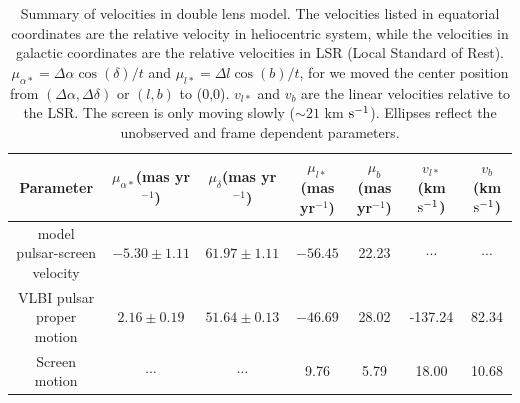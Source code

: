 \documentclass[useAMS,usenatbib]{mn2e}
\begin{document}



\begin{table}
\centering
\begin{tabular}{c|cccccc}
\hline
Parameter & $\mu_{\alpha*}$(mas yr$^{-1}$) & $\mu_{\delta}$(mas yr$^{-1}$) & $\mu_{l*}$(mas yr$^{-1}$) & $\mu_b$ (mas yr$^{-1}$) & $v_{l*}$ (km $\rm s^{-1}$) & $v_b$ (km $\rm s^{-1}$) \\
\hline
model pulsar-screen velocity & $-5.30 \pm 1.11$  & $61.97 \pm 1.11$  & $-56.45$ & 22.23 &  $\cdots$ & $\cdots$\\
VLBI pulsar proper motion & $2.16 \pm 0.19$ & $51.64 \pm 0.13$ & $-46.69$ & 28.02 & -137.24 & 82.34 \\
Screen motion & $\cdots$ & $\cdots$  & 9.76 & 5.79 & 18.00 & 10.68\\
\hline
\end{tabular}
\caption{Summary of velocities in double lens model. The velocities
listed in equatorial coordinates are the relative velocity in
heliocentric system, while the velocities in galactic coordinates are
the relative velocities in LSR (Local Standard of Rest). $\mu_{\alpha*}=\Delta\alpha\cos(\delta)/t$ and $\mu_{l*}=\Delta l\cos(b)/t$, for we moved the center position from $(\Delta\alpha,\Delta\delta)$ or $(l,b)$ to (0,0). $v_{l*}$ and $v_b$ are the linear velocities relative to the LSR. The screen is
only moving slowly ($\sim 21$ km $\rm s^{-1}$). Ellipses reflect the
unobserved and frame dependent parameters.
}
\label{Table:velocity}
\end{table}
\end{document}
